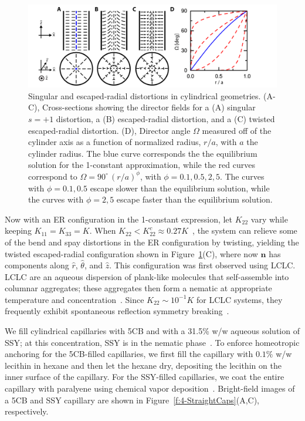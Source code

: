 \begin{figure}
  \centering
  \includegraphics{figures/C4/Ch4-Figs_EscapeSchem.png}
  \caption{Singular and escaped-radial distortions in cylindrical geometries.
  (A-C), Cross-sections showing the director fields for a (A) singular $s = +1$ distortion, a (B) escaped-radial distortion, and a (C) twisted escaped-radial distortion.
  (D), Director angle $\Omega$ measured off of the cylinder axis as a function of normalized radius, $r/a$, with $a$ the cylinder radius. The blue curve corresponds the the equilibrium solution for the 1-constant approximation, while the red curves correspond to $\Omega = 90^{\circ}\,(r/a)^{\phi}$, with $\phi = 0.1,0.5,2,5$.
  The curves with $\phi = 0.1,0.5$ escape slower than the equilibrium solution, while the curves with $\phi = 2, 5$ escape faster than the equilibrium solution.}\label{f:4-EscapeSchem}
\end{figure}

Now with an ER configuration in the 1-constant expression, let $K_{22}$ vary while keeping $K_{11} = K_{33} = K$.
When $K_{22} < K^c_{22} \approx 0.27K$~\cite{RN192}, the system can relieve some of the bend and spay distortions in the ER configuration by twisting, yielding the twisted escaped-radial configuration shown in Figure~\ref{f:4-EscapeSchem}(C), where now $\mathbf{n}$ has components along $\hat{r}$, $\hat{\theta}$, and $\hat{z}$.
This configuration was first observed using LCLC. LCLC are an aqueous dispersion of plank-like molecules that self-assemble into columnar aggregates; these aggregates then form a nematic at appropriate temperature and concentration~\cite{RN303}.
Since $K_{22} \sim 10^{-1}K$ for LCLC systems, they frequently exhibit spontaneous reflection symmetry breaking~\cite{RN192,RN191,RN293,RN193,RN302}.

We fill cylindrical capillaries with 5CB and with a 31.5\% w/w aqueous solution of SSY; at this concentration, SSY is in the nematic phase~\cite{RN303}.
To enforce homeotropic anchoring for the 5CB-filled capillaries, we first fill the capillary with $0.1\%$ w/w lecithin in hexane and then let the hexane dry, depositing the lecithin on the inner surface of the capillary.
For the SSY-filled capillaries, we coat the entire capillary with paralyene using chemical vapor deposition~\cite{RN192}.
Bright-field images of a 5CB and SSY capillary are shown in Figure~\ref{f:4-StraightCaps}(A,C), respectively.


